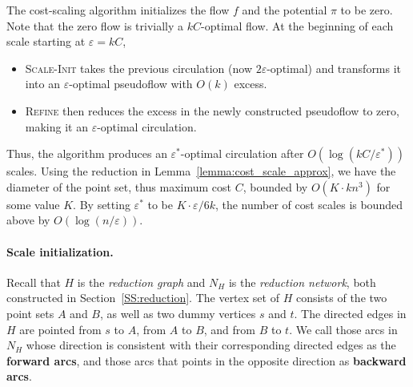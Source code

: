 \documentclass[11pt]{article}
\def\eps{\varepsilon}
\def\supp{\operatorname{supp}}
\theoremstyle{plain}
\numberwithin{figure}{section}
\def\EMPH#1{\textbf{\boldmath #1}}
\begin{document}
The cost-scaling algorithm initializes the flow $f$ and the potential $\pi$ to be zero.
Note that the zero flow is trivially a $kC$-optimal flow.
At the beginning of each scale starting at $\eps = kC$,
\begin{itemize}
\item
\textsc{Scale-Init} takes the previous
circulation (now $2\eps$-optimal) and transforms it into an $\eps$-optimal
pseudoflow with $O(k)$ excess.
\item
\textsc{Refine} then reduces the excess in the newly constructed pseudoflow to zero, making it an $\eps$-optimal
circulation.
\end{itemize}
Thus, the algorithm produces an $\eps^*$-optimal circulation after
$O(\log(kC/\eps^*))$ scales.
%
Using the reduction in Lemma~\ref{lemma:cost_scale_approx}, we have the diameter of the point set, thus maximum cost $C$, bounded by $O(K \cdot kn^3)$ for some value $K$.  By setting $\eps^*$ to be $K \cdot \eps/6k$, the number of cost scales is bounded above by $O(\log(n/\eps))$.


\paragraph{Scale initialization.}


Recall that $H$ is the \emph{reduction graph} and $N_H$ is the \emph{reduction network}, both constructed in Section~\ref{SS:reduction}.  The vertex set of $H$ consists of the two point sets $A$ and $B$, as well as two dummy vertices $s$ and $t$.  The directed edges in $H$ are pointed from $s$ to $A$, from $A$ to $B$, and from $B$ to $t$.  We call those arcs in $N_H$ whose direction is consistent with their corresponding directed edges as the \EMPH{forward arcs}, and those arcs that points in the opposite direction as \EMPH{backward arcs}.
\end{document}
